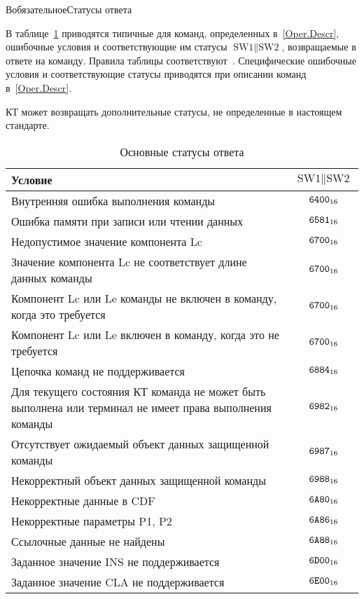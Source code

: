 \begin{appendix}{В}{обязательное}{Статусы ответа}
\label{ERRORS}

\mbox{}

В таблице~\ref{Table.Errors.General} приводятся типичные для команд, 
определенных в~\ref{Oper.Descr},
ошибочные условия и соответствующие им 
статусы $\text{SW1} \parallel \text{SW2}$,
возвращаемые в ответе на команду.
Правила таблицы соответствуют~\cite{APDU}.
%
Специфические ошибочные условия и соответствующие статусы приводятся 
при описании команд в~\ref{Oper.Descr}.

КТ может возвращать дополнительные статусы,
не определенные в настоящем стандарте.

\begin{table}[hbt]
\caption{Основные статусы ответа}
\label{Table.Errors.General}
\begin{tabular}{|p{14cm}|c|}
\hline
Условие & $\text{SW1} \parallel \text{SW2}$\\
\hline
\hline
Внутренняя ошибка выполнения команды & $\texttt{6400}_{16}$ \\
\hline
Ошибка памяти при записи или чтении данных & $\texttt{6581}_{16}$ \\
\hline
Недопустимое значение компонента Lc & $\texttt{6700}_{16}$ \\
\hline
Значение компонента Lc не соответствует длине данных команды& $\texttt{6700}_{16}$ \\
\hline
Компонент Lc или Le команды не включен в команду, 
когда это требуется& $\texttt{6700}_{16}$ \\
\hline
Компонент Lc или Le включен в команду, 
когда это не требуется& $\texttt{6700}_{16}$ \\
\hline
Цепочка команд не поддерживается & $\texttt{6884}_{16}$ \\
\hline
Для текущего состояния КТ команда не может быть выполнена
или терминал не имеет права выполнения команды & $\texttt{6982}_{16}$ \\
\hline
Отсутствует ожидаемый объект данных защищенной 
команды & $\texttt{6987}_{16}$ \\
\hline
Некорректный объект данных защищенной команды & $\texttt{6988}_{16}$ \\
\hline
Некорректные данные в CDF & $\texttt{6A80}_{16}$ \\
\hline
Некорректные параметры P1, P2 & $\texttt{6A86}_{16}$ \\
\hline
Ссылочные данные не найдены & $\texttt{6A88}_{16}$ \\
\hline
Заданное значение INS не поддерживается & $\texttt{6D00}_{16}$ \\
\hline
Заданное значение CLA не поддерживается & $\texttt{6E00}_{16}$ \\
\hline
\end{tabular}
\end{table}

\mbox{}
\vfill
\mbox{}
\clearpage

\end{appendix}